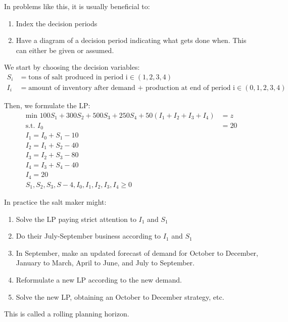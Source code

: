 \documentclass{article}
\begin{document}
\begin{answer}
    
    
    In problems like this, it is usually beneficial to: \\
    \begin{enumerate}
        \item Index the decision periods
        \item Have a diagram of a decision period indicating what gets done
        when. This can either be given or assumed.
    \end{enumerate}
    
    We start by choosing the decision variables: \\
    \begin{align*}
        S_i&=\text{tons of salt produced in period i}\in(1,2,3,4) \\
        I_i&=\text{amount of inventory after demand + production at end of period i}\in(0,1,2,3,4)
    \end{align*}

    Then, we formulate the LP: \\
    \begin{align*}
        \text{min }100S_1+300S_2+500S_3+250S_4+50(I_1+I_2+I_3+I_4)&=z\\
        \text{s.t. }I_0&=20 \\
        I_1=I_0+S_1-10 \\
        I_2=I_1+S_2-40 \\
        I_3=I_2+S_3-80 \\
        I_4=I_3+S_4-40\\
        I_4=20 \\
        S_1,S_2,S_3,S-4,I_0,I_1,I_2,I_3,I_4\geq0
    \end{align*}

    \begin{note}
        In practice the salt maker might:
        \begin{enumerate}
            \item Solve the LP paying strict attention to \(I_1\) and \(S_1\)
            \item Do their July-September business according to \(I_1\) and \(S_1\)
            \item In September, make an updated forecast of demand for October to December, 
            January to March, April to June, and July to September.
            \item Reformulate a new LP according to the new demand. 
            \item Solve the new LP, obtaining an October to December strategy, etc. 
        \end{enumerate} 

        This is called a rolling planning horizon.
    \end{note}
\end{answer}
\end{document}
